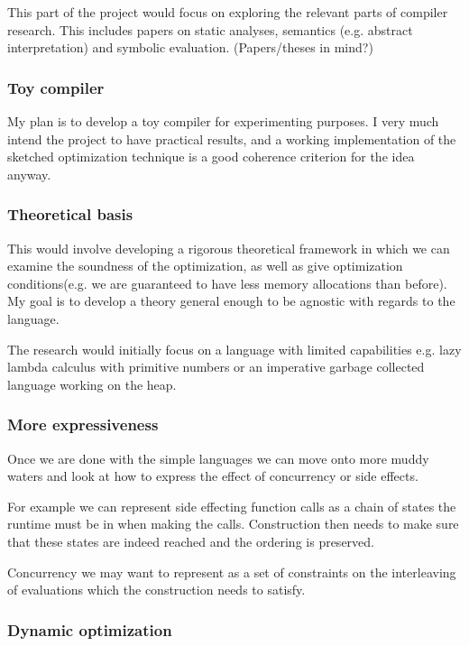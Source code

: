 \documentclass[a4paper]{article}
\begin{document}
This part of the project would focus on exploring the relevant parts of compiler research. This includes papers on static analyses, semantics (e.g. abstract interpretation) and symbolic evaluation. (Papers/theses in mind?)

\subsubsection*{Toy compiler}

My plan is to develop a toy compiler for experimenting purposes. I very much intend the project to have practical results, and a working implementation of the sketched optimization technique is a good coherence criterion for the idea anyway.

\subsubsection*{Theoretical basis}

This would involve developing a rigorous theoretical framework in which we can examine the soundness of the optimization, as well as give optimization conditions(e.g. we are guaranteed to have less memory allocations than before). My goal is to develop a theory general enough to be agnostic with regards to the language.

The research would initially focus on a language with limited capabilities e.g. lazy lambda calculus with primitive numbers or an imperative garbage collected language working on the heap.

\subsubsection*{More expressiveness}

Once we are done with the simple languages we can move onto more muddy waters and look at how to express the effect of concurrency or side effects.

For example we can represent side effecting function calls as a chain of states the runtime must be in when making the calls. Construction then needs to make sure that these states are indeed reached and the ordering is preserved.

Concurrency we may want to represent as a set of constraints on the interleaving of evaluations which the construction needs to satisfy.

\subsubsection*{Dynamic optimization}
\end{document}
